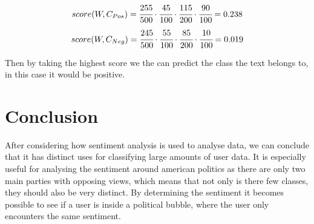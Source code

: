 \begin{equation}\label{e:Pos}
score(W, C_{Pos}) = \cfrac{255}{500} \cdot \cfrac{45}{100} \cdot
\cfrac{115}{200} \cdot \cfrac{90}{100} = 0.238
\end{equation}
\begin{equation}\label{e:Neg}
score(W, C_{Neg}) = \cfrac{245}{500} \cdot \cfrac{55}{100} \cdot \cfrac{85}{200}
\cdot \cfrac{10}{100} = 0.019
\end{equation}

Then by taking the highest score we the can predict the class the text belongs
to, in this case it would be positive.

\section{Conclusion}\label{sec:DAConc}
After considering how sentiment analysis is used to analyse data, we can
conclude that it has distinct uses for classifying large amounts of user data.
It is especially useful for analysing the sentiment around american politics as
there are only two main parties with opposing views, which means that not only
is there few classes, they should also be very distinct. By determining the
sentiment it becomes possible to see if a user is inside a political bubble,
where the user only encounters the same sentiment.



